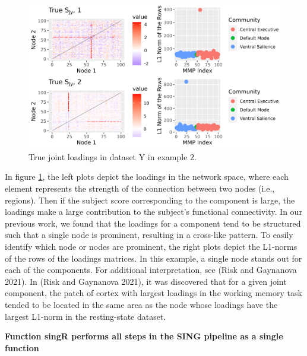\begin{figure}
\includegraphics[width=1\linewidth]{figures/ex2true_loadingsY} \caption{True joint loadings in dataset Y in example 2.}\label{fig:truey}
\end{figure}

In figure \ref{fig:truey}, the left plots depict the loadings in the network space, where each element represents the strength of the connection between two nodes (i.e., regions). Then if the subject score corresponding to the component is large, the loadings make a large contribution to the subject's functional connectivity. In our previous work, we found that the loadings for a component tend to be structured such that a single node is prominent, resulting in a cross-like pattern. To easily identify which node or nodes are prominent, the right plots depict the L1-norms of the rows of the loadings matrices. In this example, a single node stands out for each of the components. For additional interpretation, see (Risk and Gaynanova 2021). In (Risk and Gaynanova 2021), it was discovered that for a given joint component, the patch of cortex with largest loadings in the working memory task tended to be located in the same area as the node whose loadings have the largest L1-norm in the resting-state dataset.

\textbf{Function singR performs all steps in the SING pipeline as a single function}

